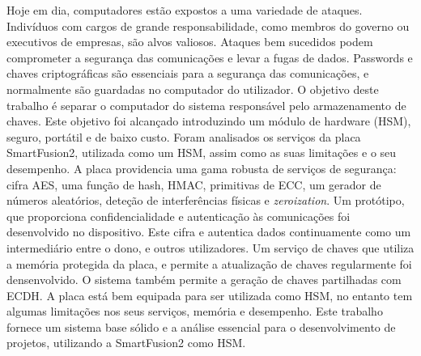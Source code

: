 \noindent Hoje em dia, computadores estão expostos a uma variedade de ataques. Indivíduos com cargos de grande responsabilidade, como membros do governo ou executivos de empresas, são alvos valiosos. Ataques bem sucedidos podem comprometer a segurança das comunicações e levar a fugas de dados. Passwords e chaves criptográficas são essenciais para a segurança das comunicações, e normalmente são guardadas no computador do utilizador. O objetivo deste trabalho é separar o computador do sistema responsável pelo armazenamento de chaves. Este objetivo foi alcançado introduzindo um módulo de hardware (HSM), seguro, portátil e de baixo custo. Foram analisados os serviços da placa SmartFusion2, utilizada como um HSM, assim como as suas limitações e o seu desempenho. A placa providencia uma gama robusta de serviços de segurança: cifra AES, uma função de hash, HMAC, primitivas de ECC, um gerador de números aleatórios, deteção de interferências físicas e \textit{zeroization}. Um protótipo, que proporciona confidencialidade e autenticação às comunicações foi desenvolvido no dispositivo. Este cifra e autentica dados continuamente como um intermediário entre o dono, e outros utilizadores. Um serviço de chaves que utiliza a memória protegida da placa, e permite a atualização de chaves regularmente foi densenvolvido. O sistema também permite a geração de chaves partilhadas com ECDH. A placa está bem equipada para ser utilizada como HSM, no entanto tem algumas limitações nos seus serviços, memória e desempenho. Este trabalho fornece um sistema base sólido e a análise essencial para o desenvolvimento de projetos, utilizando a SmartFusion2 como HSM.
